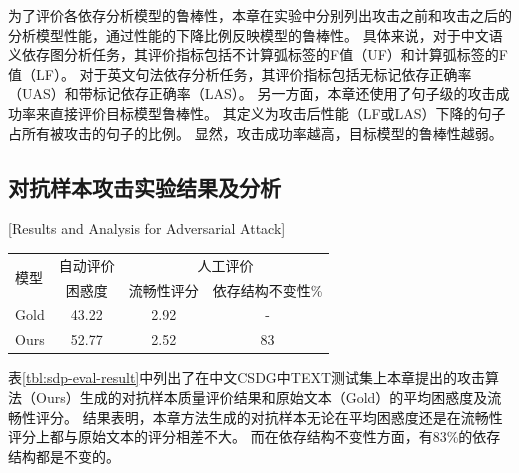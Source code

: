 为了评价各依存分析模型的鲁棒性，本章在实验中分别列出攻击之前和攻击之后的分析模型性能，通过性能的下降比例反映模型的鲁棒性。
具体来说，对于中文语义依存图分析任务，其评价指标包括不计算弧标签的F值（UF）和计算弧标签的F值（LF）。
对于英文句法依存分析任务，其评价指标包括无标记依存正确率（UAS）和带标记依存正确率（LAS）。
另一方面，本章还使用了句子级的攻击成功率来直接评价目标模型鲁棒性。
其定义为攻击后性能（LF或LAS）下降的句子占所有被攻击的句子的比例。
显然，攻击成功率越高，目标模型的鲁棒性越弱。


\subsection{对抗样本攻击实验结果及分析}[Results and Analysis for Adversarial Attack]
\label{sec:chapter3-results}

\begin{table}[htbp]
    \vspace{0.5em}\centering\wuhao
	\begin{tabular}{lccc}
		\toprule[1.5pt]
		\multirow{2}{*}{模型}& 自动评价 & \multicolumn{2}{c}{人工评价} \\
		\cmidrule(r){2-2} \cmidrule(r){3-4}
		& 困惑度 &  流畅性评分 & 依存结构不变性\%  \\
		\midrule[1pt]
		Gold & 43.22 & 2.92 & - \\
		Ours & 52.77 & 2.52 & 83  \\
		\bottomrule[1.5pt]
	\end{tabular}
\end{table}

表\ref{tbl:sdp-eval-result}中列出了在中文CSDG中TEXT测试集上本章提出的攻击算法（Ours）生成的对抗样本质量评价结果和原始文本（Gold）的平均困惑度及流畅性评分。
结果表明，本章方法生成的对抗样本无论在平均困惑度还是在流畅性评分上都与原始文本的评分相差不大。
而在依存结构不变性方面，有83\%的依存结构都是不变的。

